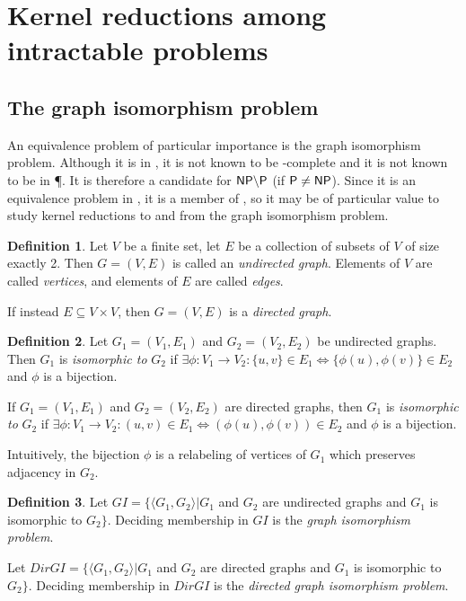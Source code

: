 \documentclass{article}
\theoremstyle{definition} \newtheorem{definition}[definition]{Definition}
\newcommand{\defn}[1]{\emph{#1}} %
\newcommand{\pair}[2]{\langle#1,#2\rangle} %
\begin{document}


\section{Kernel reductions among intractable problems} \label{sec:np}

\subsection{The graph isomorphism problem}

An equivalence problem of particular importance is the graph isomorphism
problem. Although it is in \NP, it is not known to be \NP-complete and it is
not known to be in \P. It is therefore a candidate for ${\mathsf{NP}}\backslash{\ensuremath{\mathsf{P}}}$ (if
${\mathsf{P}}\neq{\ensuremath{\mathsf{NP}}}$). Since it is an equivalence problem in \NP, it is a member of
\NPEq, so it may be of particular value to study kernel reductions to and from
the graph isomorphism problem. 

\begin{definition}
  Let $V$ be a finite set, let $E$ be a collection of subsets of $V$ of size
  exactly 2. Then $G=(V, E)$ is called an \defn{undirected graph}. Elements of
  $V$ are called \defn{vertices}, and elements of $E$ are called \defn{edges}.

  If instead $E\subseteq V\times V$, then $G=(V, E)$ is a \defn{directed
    graph}.
\end{definition}
\begin{definition}
  Let $G_1=(V_1,E_1)$ and $G_2=(V_2, E_2)$ be undirected graphs. Then $G_1$ is
  \defn{isomorphic to} $G_2$ if $\exists \phi\colon V_1\to V_2:\{u,v\}\in
  E_1\iff \{\phi(u), \phi(v)\}\in E_2$ and $\phi$ is a bijection.

  If $G_1=(V_1,E_1)$ and $G_2=(V_2, E_2)$ are directed graphs, then $G_1$ is
  \defn{isomorphic to} $G_2$ if $\exists \phi\colon V_1\to V_2:(u,v)\in E_1\iff
  (\phi(u), \phi(v))\in E_2$ and $\phi$ is a bijection.
\end{definition}
Intuitively, the bijection $\phi$ is a relabeling of vertices of $G_1$ which
preserves adjacency in $G_2$.

\begin{definition}
  Let $GI=\{\pair{G_1}{G_2}|G_1$ and $G_2$ are undirected graphs and $G_1$ is
  isomorphic to $G_2\}$. Deciding membership in $GI$ is the \defn{graph
    isomorphism problem}.

  Let $DirGI=\{\pair{G_1}{G_2}|G_1$ and $G_2$ are directed graphs and $G_1$ is
  isomorphic to $G_2\}$. Deciding membership in $DirGI$ is the \defn{directed
    graph isomorphism problem}.
\end{definition}
\end{document}
